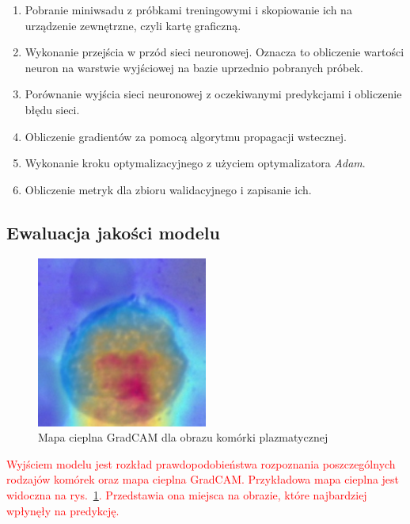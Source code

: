 \begin{enumerate}
    \item Pobranie miniwsadu z próbkami treningowymi i skopiowanie ich na urządzenie zewnętrzne, czyli kartę graficzną.
    \item Wykonanie przejścia w przód sieci neuronowej.
    Oznacza to obliczenie wartości neuron na warstwie wyjściowej na bazie uprzednio pobranych próbek.
    \item Porównanie wyjścia sieci neuronowej z oczekiwanymi predykcjami i obliczenie błędu sieci.
    \item Obliczenie gradientów za pomocą algorytmu propagacji wstecznej.
    \item Wykonanie kroku optymalizacyjnego z użyciem optymalizatora \textit{Adam}.
    \item Obliczenie metryk dla zbioru walidacyjnego i zapisanie ich.
\end{enumerate}



\subsection{Ewaluacja jakości modelu}

\begin{figure}
    \centering
    \includegraphics[width=0.5\textwidth]{cam}
    \caption{Mapa cieplna GradCAM dla obrazu komórki plazmatycznej}
    \label{fig:cam}
\end{figure}

\textcolor{red}{
    Wyjściem modelu jest rozkład prawdopodobieństwa rozpoznania poszczególnych rodzajów komórek oraz mapa cieplna GradCAM.
    Przykładowa mapa cieplna jest widoczna na rys.~\ref{fig:cam}.
    Przedstawia ona miejsca na obrazie, które najbardziej wpłynęły na predykcję.
}

